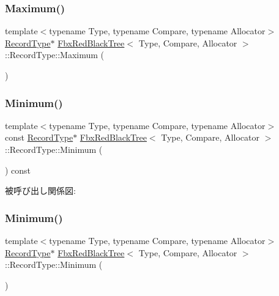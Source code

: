 \subsubsection{\texorpdfstring{Maximum()}{Maximum()}\hspace{0.1cm}{\footnotesize\ttfamily [2/2]}}
{\footnotesize\ttfamily template$<$typename Type, typename Compare, typename Allocator$>$ \\
\hyperlink{class_fbx_red_black_tree_1_1_record_type}{Record\+Type}$\ast$ \hyperlink{class_fbx_red_black_tree}{Fbx\+Red\+Black\+Tree}$<$ Type, Compare, Allocator $>$\+::Record\+Type\+::\+Maximum (\begin{DoxyParamCaption}{ }\end{DoxyParamCaption})}

\mbox{\label{class_fbx_red_black_tree_1_1_record_type_ac7846a2d9d25168a1f9d62b53b2ffa8b}} 
\subsubsection{\texorpdfstring{Minimum()}{Minimum()}\hspace{0.1cm}{\footnotesize\ttfamily [1/2]}}
{\footnotesize\ttfamily template$<$typename Type, typename Compare, typename Allocator$>$ \\
const \hyperlink{class_fbx_red_black_tree_1_1_record_type}{Record\+Type}$\ast$ \hyperlink{class_fbx_red_black_tree}{Fbx\+Red\+Black\+Tree}$<$ Type, Compare, Allocator $>$\+::Record\+Type\+::\+Minimum (\begin{DoxyParamCaption}{ }\end{DoxyParamCaption}) const}

被呼び出し関係図\+:
\mbox{\label{class_fbx_red_black_tree_1_1_record_type_a19afa18da8e3def639d0f4e8e9ab1a39}} 
\subsubsection{\texorpdfstring{Minimum()}{Minimum()}\hspace{0.1cm}{\footnotesize\ttfamily [2/2]}}
{\footnotesize\ttfamily template$<$typename Type, typename Compare, typename Allocator$>$ \\
\hyperlink{class_fbx_red_black_tree_1_1_record_type}{Record\+Type}$\ast$ \hyperlink{class_fbx_red_black_tree}{Fbx\+Red\+Black\+Tree}$<$ Type, Compare, Allocator $>$\+::Record\+Type\+::\+Minimum (\begin{DoxyParamCaption}{ }\end{DoxyParamCaption})}


